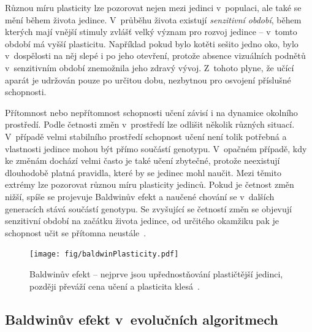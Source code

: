 Různou míru plasticity lze pozorovat nejen mezi jedinci v~populaci, ale také se mění během života jedince. V~průběhu života existují \emph{senzitivní období}, během kterých mají vnější stimuly zvlášť velký význam pro rozvoj jedince -- v~tomto období má vyšší plasticitu. Například pokud bylo kotěti sešito jedno oko, bylo v~dospělosti na něj slepé i po jeho otevření, protože absence vizuálních podnětů v~senzitivním období znemožnila jeho zdravý vývoj. Z~tohoto plyne, že učící aparát je udržován pouze po určitou dobu, nezbytnou pro osvojení příslušné schopnosti.

Přítomnost nebo nepřítomnost schopnosti učení závisí i na dynamice okolního prostředí. Podle četnosti změn v~prostředí lze odlišit několik různých situací. V~případě velmi stabilního prostředí schopnost učení není tolik potřebná a vlastnosti jedince mohou být přímo součástí genotypu. V~opačném případě, kdy ke změnám dochází velmi často je také učení zbytečné, protože neexistují dlouhodobě platná pravidla, které by se jedinec mohl naučit. Mezi těmito extrémy lze pozorovat různou míru plasticity jedinců. Pokud je četnost změn nižší, spíše se projevuje Baldwinův efekt a naučené chování se v~dalších generacích stává součástí genotypu. Se zvyšující se četností změn se objevují senzitivní období na začátku života jedince, od určitého okamžiku pak je schopnost učit se přítomna neustále~\cite{EllefsenBalancing}.

\begin{figure}[htb]
    \centering\texttt{[image: fig/baldwinPlasticity.pdf]}
    \caption{Baldwinův efekt -- nejprve jsou upřednostňování plastičtější jedinci, později převáží cena učení a plasticita klesá~\cite{EllefsenBalancing}.}
    \label{obrBaldwin}
\end{figure}

\subsection{Baldwinův efekt v~evolučních algoritmech}

